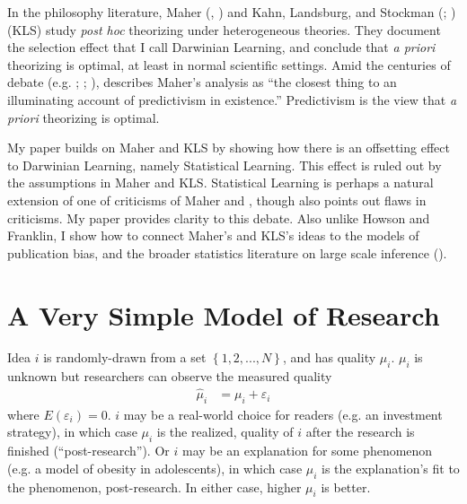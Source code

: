 \documentclass[12pt,english]{article}
\theoremstyle{plain}
\theoremstyle{plain}
\begin{document}
In the philosophy literature, Maher (\citeyear{maher1988prediction}, \citeyear{maher1990prediction}) and Kahn, Landsburg, and Stockman (\citeyear{kahn1992novel}; \citeyear{kahn1996positive}) (KLS) study \emph{post hoc} theorizing under heterogeneous theories. They document the selection effect that I call Darwinian Learning, and conclude that \emph{a priori} theorizing is optimal, at least in normal scientific settings. Amid the centuries of  debate  (e.g. \citet{leibniz1678letter}; \citet{newton1726scholium}; \citet{keynes1921treatise}), \citet{barnes1996discussion} describes Maher's analysis as ``the closest thing to an illuminating account of predictivism in existence.'' Predictivism is the view that \emph{a priori} theorizing is optimal.

My paper builds on Maher and KLS by showing how there is an offsetting effect to Darwinian Learning, namely Statistical Learning. This effect is ruled out by the assumptions in Maher and KLS. Statistical Learning is perhaps a natural extension of one of  criticisms of Maher \citeyearpar{maher1988prediction} and \citeyearpar{maher1990prediction}, though \citet{maher1993discussion} also points out flaws in  criticisms.  My paper provides clarity to this debate. Also unlike Howson and Franklin, I show how to connect Maher's and KLS's ideas to the models of publication bias, and the broader statistics literature on large scale inference  (\citet{efron2012large}).

\section{A Very Simple Model of Research}\label{sec:ez}

Idea $i$ is randomly-drawn from a set $\left\{ 1,2,...,N\right\}$, and has quality $\mu_{i}$. $\mu_{i}$ is unknown but researchers can observe the measured quality
\begin{align}
\hat{\mu}_{i} &= \mu_{i} + \varepsilon_{i}
\label{eq:ez:muhat}
\end{align}
where $E\left(\varepsilon_{i}\right) = 0$. $i$ may be a real-world choice for readers (e.g. an investment strategy), in which case $\mu_{i}$ is the realized, quality of $i$ after the research is finished (``post-research''). Or $i$ may be an explanation for some phenomenon (e.g. a model of obesity in adolescents), in which case $\mu_{i}$ is the explanation's fit to the phenomenon, post-research. In either case, higher $\mu_{i}$ is better.
\end{document}
